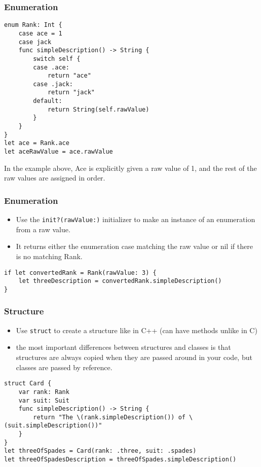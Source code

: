 \begin{frame}[fragile] \frametitle{Enumeration}
\begin{lstlisting}
enum Rank: Int {
    case ace = 1
    case jack
    func simpleDescription() -> String {
        switch self {
        case .ace:
            return "ace"
        case .jack:
            return "jack"
        default:
            return String(self.rawValue)
        }
    }
}
let ace = Rank.ace
let aceRawValue = ace.rawValue
\end{lstlisting}
In the example above, Ace is explicitly given a raw value of 1, and the rest of the raw values are assigned in order.

\end{frame}

\begin{frame}[fragile] \frametitle{Enumeration}

\begin{itemize}
\item Use the \lstinline|init?(rawValue:)| initializer to make an instance of an enumeration from a raw value. 
\item It returns either the enumeration case matching the raw value or nil if there is no matching Rank.
\end{itemize}

\begin{lstlisting}
if let convertedRank = Rank(rawValue: 3) {
    let threeDescription = convertedRank.simpleDescription()
}
\end{lstlisting}
\end{frame}

\begin{frame}[fragile] \frametitle{Structure}

\begin{itemize}
\item Use \lstinline|struct| to create a structure like in C++ (can have methods unlike in C)
\item the most important differences between structures and classes is that structures are always copied when they are passed around in your code, but classes are passed by reference.
\end{itemize}

\begin{lstlisting}
struct Card {
    var rank: Rank
    var suit: Suit
    func simpleDescription() -> String {
        return "The \(rank.simpleDescription()) of \(suit.simpleDescription())"
    }
}
let threeOfSpades = Card(rank: .three, suit: .spades)
let threeOfSpadesDescription = threeOfSpades.simpleDescription()
\end{lstlisting}
\end{frame}

